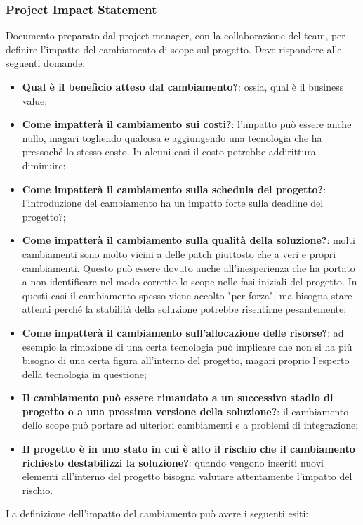 \subsubsection{Project Impact Statement}
Documento preparato dal project manager, con la collaborazione del team, per definire l’impatto del cambiamento di scope sul progetto.
Deve rispondere alle seguenti domande:
\begin{itemize}
	\item \textbf{Qual è il beneficio atteso dal cambiamento?}: ossia, qual è il business value;
	\item \textbf{Come impatterà il cambiamento sui costi?}: l'impatto può essere anche nullo, magari togliendo qualcosa e aggiungendo una tecnologia che ha pressoché lo stesso costo. In alcuni casi il costo potrebbe addirittura diminuire;
	\item \textbf{Come impatterà il cambiamento sulla schedula del progetto?}: l'introduzione del cambiamento ha un impatto forte sulla deadline del progetto?;
	\item \textbf{Come impatterà il cambiamento sulla qualità della soluzione?}: molti cambiamenti sono molto vicini a delle patch piuttosto che a veri e propri cambiamenti. Questo può essere dovuto anche all'inesperienza che ha portato a non identificare nel modo corretto lo scope nelle fasi iniziali del progetto. In questi casi il cambiamento spesso viene accolto "per forza", ma bisogna stare attenti perché la stabilità della soluzione potrebbe risentirne pesantemente;
	\item \textbf{Come impatterà il cambiamento sull’allocazione delle risorse?}: ad esempio la rimozione di una certa tecnologia può implicare che non si ha più bisogno di una certa figura all'interno del progetto, magari proprio l'esperto della tecnologia in questione;
	\item \textbf{Il cambiamento può essere rimandato a un successivo stadio di progetto o a una prossima versione della soluzione?}: il cambiamento dello scope può portare ad ulteriori cambiamenti e a problemi di integrazione;
	\item \textbf{Il progetto è in uno stato in cui è alto il rischio che il cambiamento richiesto destabilizzi la soluzione?}: quando vengono inseriti nuovi elementi all'interno del progetto bisogna valutare attentamente l'impatto del rischio.
\end{itemize}
La definizione dell’impatto del cambiamento può avere i seguenti esiti:
